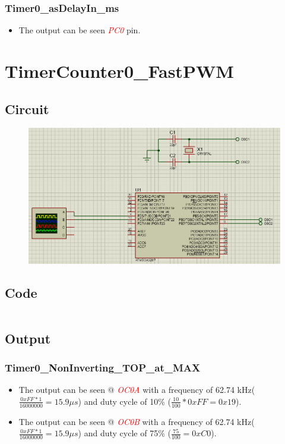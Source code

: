 \documentclass[oneside]{book}
\newcommand{\pinFormat}[1]{\emph{\textcolor{red}{#1}}}
\begin{document}
\subsubsection{Timer0\_asDelayIn\_ms}
\begin{itemize}
    \item The output can be seen \pinFormat{PC0} pin.
\end{itemize}


\section{TimerCounter0\_FastPWM}
\subsection{Circuit}
\begin{figure}[H]
    \centering
    \includegraphics[height=0.2\textheight]{TimerCounter0_FastPWM.png}
\end{figure}
\subsection{Code}
\inputminted[breaklines, bgcolor=black]{c}{../programFiles/TimerCounter0_FastPWM.c}
\subsection{Output}
\subsubsection{Timer0\_NonInverting\_TOP\_at\_MAX}
\begin{itemize}
    \item The output can be seen @ \pinFormat{OC0A} with a frequency of 62.74 kHz($\frac{0xFF * 1}{16000000} = 15.9\mu s$) and duty cycle of 10\% ($\frac{10}{100} * 0xFF = 0x19$).
    \item The output can be seen @ \pinFormat{OC0B} with a frequency of 62.74 kHz($\frac{0xFF * 1}{16000000} = 15.9\mu s$) and duty cycle of 75\% ($\frac{75}{100} = 0xC0$).
\end{itemize}
\end{document}
